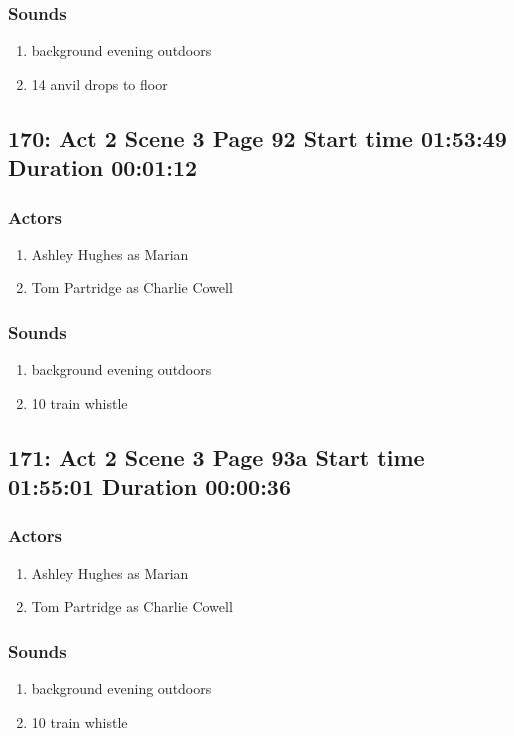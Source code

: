 \subsubsection{Sounds}
\begin{enumerate}
\item background evening outdoors
\item 14 anvil drops to floor
\end{enumerate}
\subsection{170: Act 2 Scene 3 Page 92 Start time 01:53:49 Duration 00:01:12}

\subsubsection{Actors}
\begin{enumerate}
\item Ashley Hughes as Marian
\item Tom Partridge as Charlie Cowell
\end{enumerate}

\subsubsection{Sounds}
\begin{enumerate}
\item background evening outdoors
\item 10 train whistle
\end{enumerate}
\subsection{171: Act 2 Scene 3 Page 93a Start time 01:55:01 Duration 00:00:36}

\subsubsection{Actors}
\begin{enumerate}
\item Ashley Hughes as Marian
\item Tom Partridge as Charlie Cowell
\end{enumerate}

\subsubsection{Sounds}
\begin{enumerate}
\item background evening outdoors
\item 10 train whistle
\end{enumerate}
